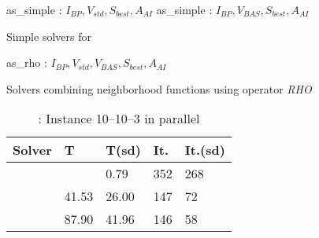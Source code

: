 \begin{algorithm}[t]
\dontprintsemicolon
\SetNoline
{}
   as\_simple\;
\algoindent {} : $I_{BP}, V_{std}, S_{best}, A_{AI}$ \;
   as\_simple\;
\algoindent {} : $I_{BP}, V_{BAS}, S_{best}, A_{AI}$ \; 
\caption{Simple solvers for \SGP}\label{as:golfers10-10-3}
\end{algorithm}

\begin{algorithm}[H]
\dontprintsemicolon
\SetNoline
{}
   as\_rho\;
\algoindent {} : $I_{BP}, V_{std}, V_{BAS}, S_{best}, A_{AI}$ \;
\caption{Solvers combining neighborhood functions using operator {\it RHO}}\label{as:golfers_rho}
\end{algorithm}

\begin{table}
\centering 
\renewcommand{\arraystretch}{1}
\begin{tabular}{p{4cm}|R{1.3cm}R{1.3cm}R{1.3cm}R{1.3cm}}
\hline
{\bf Solver} & T & T(sd) & It. & It.(sd) \\
\hline
\texttt{} &  & 0.79 & 352 & 268 \\		
\texttt{} & 41.53 & 26.00 & 147 & 72\\
\texttt{} & 87.90 & 41.96 & 146 & 58 \\
\hline
\end{tabular}
\caption{\sg: Instance 10--10--3 in parallel}
\label{tab:golfers10-10-3}
\end{table}

